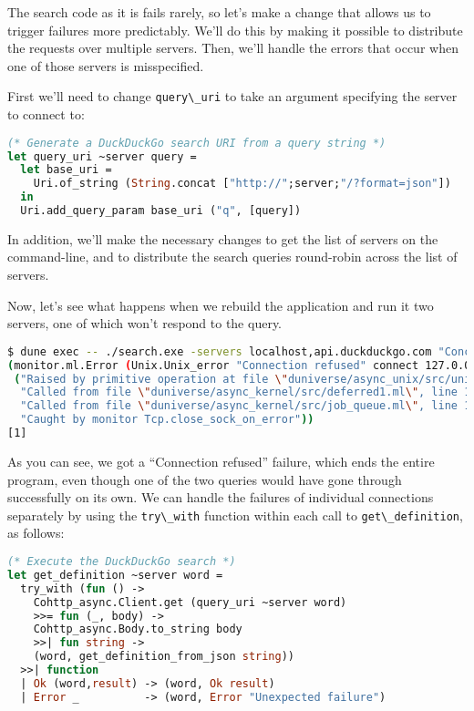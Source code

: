 The search code as it is fails rarely, so let's make a change that
allows us to trigger failures more predictably. We'll do this by making
it possible to distribute the requests over multiple servers. Then,
we'll handle the errors that occur when one of those servers is
misspecified.

First we'll need to change \passthrough{\lstinline!query\_uri!} to take
an argument specifying the server to connect to:

\begin{lstlisting}[language=Caml]
(* Generate a DuckDuckGo search URI from a query string *)
let query_uri ~server query =
  let base_uri =
    Uri.of_string (String.concat ["http://";server;"/?format=json"])
  in
  Uri.add_query_param base_uri ("q", [query])
\end{lstlisting}

In addition, we'll make the necessary changes to get the list of servers
on the command-line, and to distribute the search queries round-robin
across the list of servers.

Now, let's see what happens when we rebuild the application and run it
two servers, one of which won't respond to the query.

\begin{lstlisting}[language=bash]
$ dune exec -- ./search.exe -servers localhost,api.duckduckgo.com "Concurrent Programming" "OCaml"
(monitor.ml.Error (Unix.Unix_error "Connection refused" connect 127.0.0.1:80)
 ("Raised by primitive operation at file \"duniverse/async_unix/src/unix_syscalls.ml\", line 1046, characters 17-74"
  "Called from file \"duniverse/async_kernel/src/deferred1.ml\", line 17, characters 40-45"
  "Called from file \"duniverse/async_kernel/src/job_queue.ml\", line 170, characters 6-47"
  "Caught by monitor Tcp.close_sock_on_error"))
[1]
\end{lstlisting}

As you can see, we got a ``Connection refused'' failure, which ends the
entire program, even though one of the two queries would have gone
through successfully on its own. We can handle the failures of
individual connections separately by using the
\passthrough{\lstinline!try\_with!} function within each call to
\passthrough{\lstinline!get\_definition!}, as follows:

\begin{lstlisting}[language=Caml]
(* Execute the DuckDuckGo search *)
let get_definition ~server word =
  try_with (fun () ->
    Cohttp_async.Client.get (query_uri ~server word)
    >>= fun (_, body) ->
    Cohttp_async.Body.to_string body
    >>| fun string ->
    (word, get_definition_from_json string))
  >>| function
  | Ok (word,result) -> (word, Ok result)
  | Error _          -> (word, Error "Unexpected failure")
\end{lstlisting}

